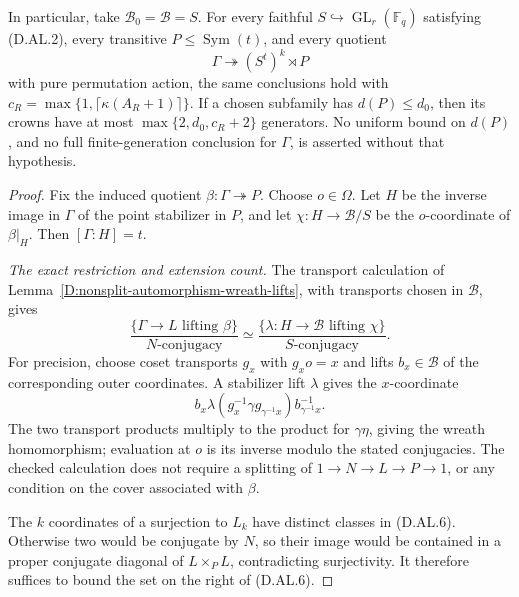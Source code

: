 \begin{theorem}
In particular, take $\mathcal B_0=\mathcal B=S$.
For every faithful $S\hookrightarrow\operatorname{GL}_r(\mathbb F_q)$
satisfying (D.AL.2), every transitive
$P\le\operatorname{Sym}(t)$, and every quotient
\[
       \Gamma\twoheadrightarrow (S^t)^k\rtimes P
                                                        \tag{D.AL.5}
\]
with pure permutation action, the same conclusions hold
with $c_R=\max\{1,\lceil\kappa(A_R+1)\rceil\}$.
If a chosen subfamily has $d(P)\le d_0$, then its crowns
have at most $\max\{2,d_0,c_R+2\}$ generators. No uniform
bound on $d(P)$, and no full finite-generation conclusion
for $\Gamma$, is asserted without that hypothesis.
\end{theorem}

\begin{proof}
Fix the induced quotient $\beta:\Gamma\twoheadrightarrow P$.
Choose $o\in\Omega$. Let $H$ be the inverse image in
$\Gamma$ of the point stabilizer in $P$, and let
$\chi:H\to\mathcal B/S$ be the $o$-coordinate of
$\beta|_H$. Then $[\Gamma:H]=t$.

\emph{The exact restriction and extension count.}
The transport calculation of
Lemma~\ref{D:nonsplit-automorphism-wreath-lifts}, with
transports chosen in $\mathcal B$, gives
\[
 \frac{\{\Gamma\to L\text{ lifting }\beta\}}
            {N\text{-conjugacy}}
 \simeq
 \frac{\{\lambda:H\to\mathcal B\text{ lifting }\chi\}}
            {S\text{-conjugacy}}.                       \tag{D.AL.6}
\]
For precision, choose coset transports $g_x$ with $g_xo=x$
and lifts $b_x\in\mathcal B$ of the corresponding outer
coordinates. A stabilizer lift $\lambda$ gives the
$x$-coordinate
\[
       b_x\lambda(g_x^{-1}\gamma g_{\gamma^{-1}x})
                                           b_{\gamma^{-1}x}^{-1}.
                                                        \tag{D.AL.7}
\]
The two transport products multiply to the product for
$\gamma\eta$, giving the wreath homomorphism; evaluation
at $o$ is its inverse modulo the stated conjugacies.
The checked calculation does not require a splitting of
$1\to N\to L\to P\to1$, or any condition on the cover
associated with $\beta$.

The $k$ coordinates of a surjection to $L_k$ have distinct
classes in (D.AL.6). Otherwise two would be conjugate by
$N$, so their image would be contained in a proper
conjugate diagonal of $L\times_P L$, contradicting
surjectivity. It therefore suffices to bound the set
on the right of (D.AL.6).


\end{proof}
